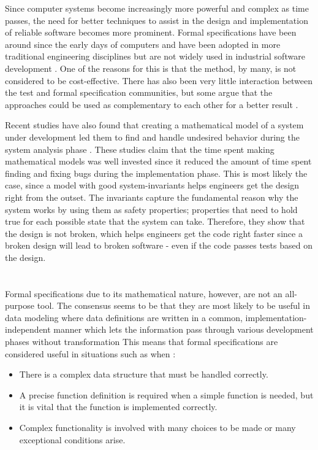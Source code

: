 \label{benefits}
Since computer systems become increasingly more powerful and complex as time passes, the need for better techniques to assist in the design and implementation of reliable software becomes more prominent. Formal specifications have been around since the early days of computers and have been adopted in more traditional engineering disciplines but are not widely used in industrial software development \cite{sommerville_software_2011}. One of the reasons for this is that the method, by many, is not considered to be cost-effective. There has also been very little interaction between the test and formal specification communities, but some argue that the approaches could be used as complementary to each other for a better result \cite{USINGFORMALSPECTESTING}. 

Recent studies have also found that creating a mathematical model of a system under development led them to find and handle undesired behavior during the system analysis phase \cite{APPLYINGFORMALSPEC} \cite{AMAZONFORMALSPEC}. These studies claim that the time spent making mathematical models was well invested since it reduced the amount of time spent finding and fixing bugs during the implementation phase. This is most likely the case, since a model with good system-invariants helps engineers get the design right from the outset. The invariants capture the fundamental reason why the system works by using them as safety properties; properties that need to hold true for each possible state that the system can take. Therefore, they show that the design is not broken, which helps engineers get the code right faster since a broken design will lead to broken software - even if the code passes tests based on the design.
\\
\\
\\
Formal specifications due to its mathematical nature, however, are not an all-purpose tool. The consensus seems to be that they are most likely to be useful in data modeling where data definitions are written in a common, implementation-independent manner which lets the information pass through various development phases without transformation  This means that formal specifications are considered useful in situations such as when \cite{APPLYINGFORMALSPEC}:

\begin{itemize}
  \item There is a complex data structure that must be handled correctly.\label{formal_spec_structuer}
  \item A precise function definition is required when a simple function is needed, but it is vital that the function is implemented correctly.
  \item Complex functionality is involved with many choices to be made or many exceptional conditions arise.
\end{itemize}

